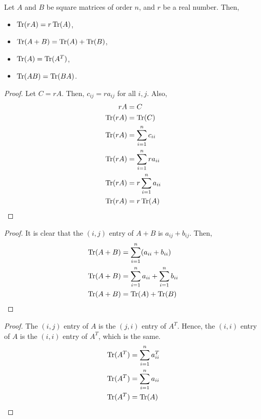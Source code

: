     \begin{thm}
        Let \(A\) and \(B\) be square matrices of order \(n\), and \(r\) be a real number. Then,
        \begin{itemize}
            \item \(\operatorname{Tr}(rA) = r \operatorname{Tr}(A)\),
            \item \(\operatorname{Tr}(A + B) = \operatorname{Tr}(A) + \operatorname{Tr}(B)\),
            \item \(\operatorname{Tr}(A) = \operatorname{Tr}(A^T)\),
            \item \(\operatorname{Tr}(AB) = \operatorname{Tr}(BA)\).
        \end{itemize}
    \end{thm}

    \begin{proof}
        Let \(C = rA\). Then, \(c_{ij} = ra_{ij}\) for all \(i, j\). Also,
        \begin{align*}
            rA &= C \\
            \operatorname{Tr}(rA) &= \operatorname{Tr}(C) \\
            \operatorname{Tr}(rA) &= \sum_{i = 1}^n c_{ii} \\
            \operatorname{Tr}(rA) &= \sum_{i = 1}^n ra_{ii} \\
            \operatorname{Tr}(rA) &= r \sum_{i = 1}^n a_{ii} \\
            \operatorname{Tr}(rA) &= r \operatorname{Tr}(A)
        \end{align*}
    \end{proof}

    \begin{proof}
        It is clear that the \((i,j)\) entry of \(A + B\) is \(a_{ij} + b_{ij}\). Then,
        \begin{align*}
            \operatorname{Tr}(A + B) &= \sum_{i = 1}^n (a_{ii} + b_{ii}) \\
            \operatorname{Tr}(A + B) &= \sum_{i = 1}^n a_{ii} + \sum_{i = 1}^n b_{ii} \\
            \operatorname{Tr}(A + B) &= \operatorname{Tr}(A) + \operatorname{Tr}(B)
        \end{align*}
    \end{proof}

    \begin{proof}
        The \((i, j)\) entry of \(A\) is the \((j, i)\) entry of \(A^T\). Hence, the \((i, i)\) entry of \(A\) is the \((i, i)\) entry of \(A^T\), which is the same. 
        \begin{align*}
            \operatorname{Tr}(A^T) &= \sum_{i = 1}^n a^T_{ii} \\
            \operatorname{Tr}(A^T) &= \sum_{i = 1}^n a_{ii} \\
            \operatorname{Tr}(A^T) &= \operatorname{Tr}(A)
        \end{align*}
    \end{proof}

